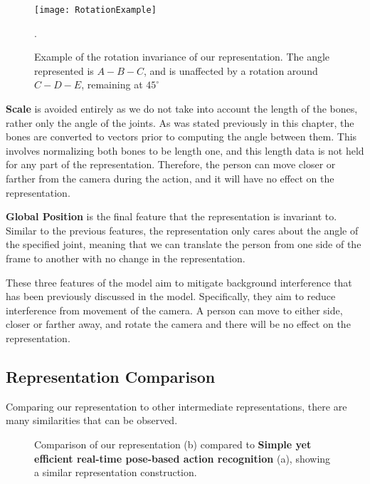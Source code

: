 \begin{figure}[ht]
	\texttt{[image: RotationExample]}
	\centering
	\caption{Example of the rotation invariance of our representation. The angle represented is $A-B-C$, and is unaffected by a rotation around $C-D-E$, remaining at $45^{\circ}$}.
	\label{fig:rotation-invariant}
\end{figure}

\textbf{Scale} is avoided entirely as we do not take into account the length of the bones, rather only the angle of the joints. As was stated previously in this chapter, the bones are converted to vectors prior to computing the angle between them. This involves normalizing both bones to be length one, and this length data is not held for any part of the representation. Therefore, the person can move closer or farther from the camera during the action, and it will have no effect on the representation.

\textbf{Global Position} is the final feature that the representation is invariant to. Similar to the previous features, the representation only cares about the angle of the specified joint, meaning that we can translate the person from one side of the frame to another with no change in the representation.

These three features of the model aim to mitigate background interference that has been previously discussed in the model. Specifically, they aim to reduce interference from movement of the camera. A person can move to either side, closer or farther away, and rotate the camera  and there will be no effect on the representation.

\subsection{Representation Comparison}

Comparing our representation to other intermediate representations, there are many similarities that can be observed.

\begin{figure}[ht]
	\centering
	\caption{Comparison of our representation (b) compared to \textbf{Simple yet efficient real-time pose-based action recognition} \cite{simple_yet_efficient} (a), showing a similar representation construction.}
	\label{fig:simple-v-ours}
\end{figure}

